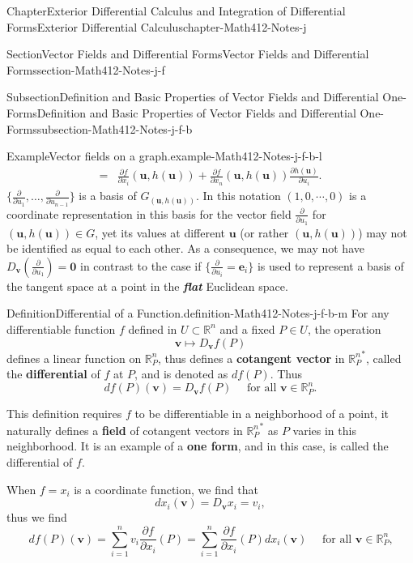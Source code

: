 \documentclass[oneside,10pt,]{book}
\newcommand{\alert}[1]{\textbf{\textit{#1}}}
\newcommand{\terminology}[1]{\textbf{#1}}
\numberwithin{equation}{section}
\newcommand{\be}{\mathbf{e}}
\newcommand{\bu}{\mathbf{u}}
\newcommand{\bv}{\mathbf{v}}
\newcommand{\bbR}{\mathbb{R}}
\newcommand{\amp}{&}
\begin{document}
\begin{chapterptx}{Chapter}{Exterior Differential Calculus and Integration of Differential Forms}{}{Exterior Differential Calculus}{}{}{chapter-Math412-Notes-j}
\begin{sectionptx}{Section}{Vector Fields and Differential Forms}{}{Vector Fields and Differential Forms}{}{}{section-Math412-Notes-j-f}
\begin{subsectionptx}{Subsection}{Definition and Basic Properties of Vector Fields and Differential One-Forms}{}{Definition and Basic Properties of Vector Fields and Differential One-Forms}{}{}{subsection-Math412-Notes-j-f-b}
\begin{example}{Example}{Vector fields on a graph.}{example-Math412-Notes-j-f-b-l}
\begin{align*}
=\amp \frac{\partial f}{\partial x_{i}}(\bu, h(\bu)) +
\frac{\partial f}{\partial x_{n}}(\bu, h(\bu))\frac{\partial h(\bu) }{\partial u_{i}}.
\end{align*}
\(\{\frac{\partial  }{\partial u_{1}}, \ldots, \frac{\partial  }{\partial u_{n-1}}\}\) is a basis of \(G_{(\bu, h(\bu))}\). In this notation \((1, 0, \cdots, 0)\) is a coordinate representation in this basis for the vector field \(\frac{\partial  }{\partial u_{1}}\) for \((\bu, h(\bu))\in G\), yet its values at different \(\bu\) (or rather \((\bu, h(\bu))\)) may not be identified as equal to each other. As a consequence, we may not have \(D_{\bv}(\frac{\partial  }{\partial u_{1}})=\mathbf 0\) in contrast to the case if \(\{\frac{\partial  }{\partial u_{i}}=\be_{i}\}\) is used to represent a basis of the tangent space at a point in the \alert{flat} Euclidean space.%
\end{example}
\begin{definition}{Definition}{Differential of a Function.}{definition-Math412-Notes-j-f-b-m}%
For any differentiable function \(f\) defined in \(U\subset \bbR^{n}\) and a fixed \(P\in U\), the operation%
\begin{equation*}
{\mathbf v} \mapsto D_{{\mathbf v}}f(P)
\end{equation*}
defines a linear function on \({\mathbb R}^{n}_{P}\), thus defines a \terminology{cotangent vector} in \({{\mathbb R}^{n}_{P}}^{*}\), called the \terminology{differential} of \(f\) at \(P\), and is denoted as \(df(P)\). Thus%
\begin{equation*}
df(P)({\mathbf v})=D_{{\mathbf v}}f(P) \quad \text{ for all $\bv \in {\mathbb R}^{n}_{P}$.}
\end{equation*}
%
\end{definition}
This definition requires \(f\) to be differentiable in a neighborhood of a point, it naturally defines a \terminology{field} of cotangent vectors in \({{\mathbb R}^{n}_{P}}^{*}\) as \(P\) varies in this neighborhood. It is an example of a  \terminology{one form}, and in this case, is called the differential  of \(f\).%
\par
When \(f=x_{i}\) is a coordinate function, we find that%
\begin{equation*}
dx_{i}({\mathbf v})=D_{{\mathbf v}}x_{i}=v_{i},
\end{equation*}
thus we find%
\begin{equation*}
df(P)({\mathbf v})=\sum_{i=1}^{n}v_{i}\frac{\partial f}{\partial x_{i}}(P)=
\sum_{i=1}^{n}\frac{\partial f}{\partial x_{i}}(P)dx_{i}({\mathbf v}) \quad \text{ for all $\bv \in {\mathbb R}^{n}_{P}$,}

\end{equation*}
\end{subsectionptx}
\end{sectionptx}
\end{chapterptx}
\end{document}
